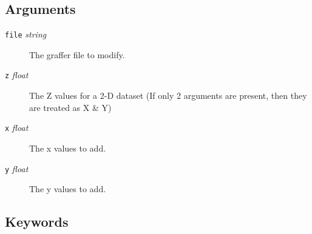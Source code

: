 \documentclass[11pt,twoside,english]{article}
\begin{document}
\subsection{Arguments}

\begin{description}
\item[\texttt{file} \textit{string}] The graffer file to modify.
\item[\texttt{z} \textit{float}] The Z values for a 2-D dataset (If
  only 2 arguments are present, then they are treated as X \& Y)
\item[\texttt{x} \textit{float}] The x values to add.
\item[\texttt{y} \textit{float}] The y values to add.
\end{description}



\subsection{Keywords}
\end{document}
